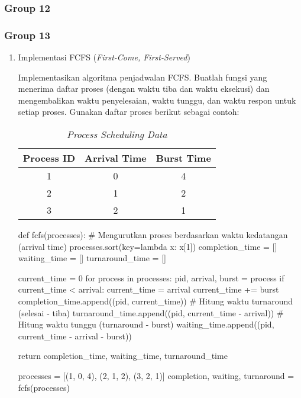 \documentclass[12pt]{article}
\begin{document}
\subsubsection{Group 12}

\subsubsection{Group 13}
\begin{enumerate}
    \item Implementasi FCFS (\textit{First-Come, First-Served})
        \par Implementasikan algoritma penjadwalan FCFS. Buatlah fungsi yang menerima daftar proses (dengan waktu tiba dan waktu eksekusi) dan mengembalikan waktu penyelesaian, waktu tunggu, dan waktu respon untuk setiap proses. Gunakan daftar proses berikut sebagai contoh:
        \begin{table}[h!]
        \centering
        \begin{tabular}{|c|c|c|}
        \hline
        \textbf{Process ID} & \textbf{Arrival Time} & \textbf{Burst Time} \\ \hline
        1 & 0 & 4 \\ \hline
        2 & 1 & 2 \\ \hline
        3 & 2 & 1 \\ \hline
        \end{tabular}
        \caption{\textit{Process Scheduling Data}}
        \end{table}
        
\begin{python}
def fcfs(processes):
    # Mengurutkan proses berdasarkan waktu kedatangan (arrival time)
    processes.sort(key=lambda x: x[1]) 
    completion_time = []
    waiting_time = []
    turnaround_time = []

    current_time = 0
    for process in processes:
        pid, arrival, burst = process
        if current_time < arrival: 
            current_time = arrival
        current_time += burst
        completion_time.append((pid, current_time))
        # Hitung waktu turnaround (selesai - tiba)
        turnaround_time.append((pid, current_time - arrival))
        # Hitung waktu tunggu (turnaround - burst)
        waiting_time.append((pid, current_time - arrival - burst))

    return completion_time, waiting_time, turnaround_time

processes = [(1, 0, 4), (2, 1, 2), (3, 2, 1)]
completion, waiting, turnaround = fcfs(processes)


\end{python}
\end{enumerate}
\end{document}
